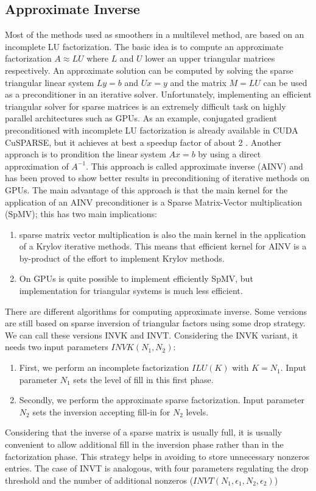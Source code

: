 \documentclass[conference]{IEEEtran}
\begin{document}
\subsection{Approximate Inverse}
Most of the methods used as smoothers in a multilevel method, are based on an incomplete LU factorization.  The basic idea is to compute an approximate factorization $A \approx LU$ where $L$ and $U$ lower an upper triangular matrices respectively. An approximate solution can be computed by solving the sparse triangular linear system $Ly=b$ and $Ux = y$ and the matrix $M=LU$ can be used as a preconditioner in an iterative solver.
Unfortunately, implementing an efficient triangular solver for sparse matrices is an extremely difficult task on highly parallel architectures such as GPUs. As an example, conjugated gradient preconditioned with incomplete LU factorization is already available in CUDA CuSPARSE, but it achieves at best a speedup factor of about 2 \cite{naumov2011incomplete}.
Another approach is to prondition the linear system $Ax = b$ by using a direct approximation of $A^{-1}$. This approach is called approximate inverse (AINV) and has been proved to show better results in preconditioning of iterative methods on GPUs. The main advantage of this approach is that the main kernel for the application of an AINV preconditioner is a Sparse Matrix-Vector multiplication (SpMV); this has two main implications:
\begin{enumerate}
\item sparse matrix vector multiplication is also the main kernel in the application of a Krylov iterative methods. This means that efficient kernel for AINV is a by-product of the effort to implement Krylov methods. 
\item On GPUs is quite possible to implement efficiently SpMV, but implementation for triangular systems is much less efficient.
\end{enumerate}
There are different algorithms for computing approximate inverse. Some versions are still based on sparse inversion of triangular factors using some drop strategy. We can call these versions INVK and INVT. Considering the INVK variant, it needs two input parameters $INVK(N_1,N_2)$:
\begin{enumerate}
\item First, we perform an incomplete factorization $ILU(K)$ with $K=N_1$. Input parameter $N_1$ sets the level of fill in this first phase.
\item Secondly, we perform the approximate sparse factorization. Input parameter $N_2$ sets the inversion accepting fill-in for $N_2$ levels. 
\end{enumerate}
Considering that the inverse of a sparse matrix is usually full, it is usually convenient to allow additional fill in the inversion phase rather than in the factorization phase. This strategy helps in avoiding to store unnecessary nonzeros entries. The case of INVT is analogous, with four parameters regulating the drop threshold and the number of additional nonzeros ($INVT(N_1,\epsilon_1, N_2, \epsilon_2)$)
  
\end{document}
